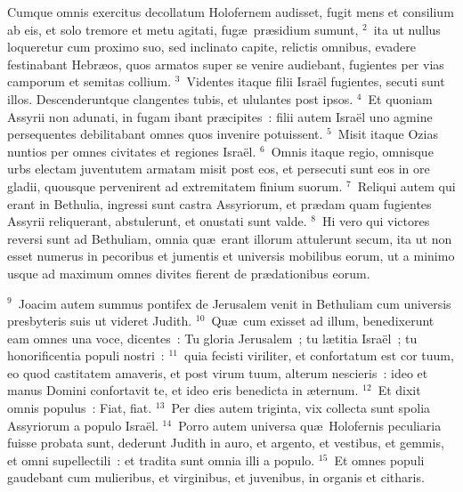 \lettrine[lines=3,image=true,loversize=0.05,lraise=-0.03]{C}{}umque omnis exercitus decollatum Holofernem audisset, fugit mens et consilium ab eis, et solo tremore et metu agitati, fug\ae\ pr\ae sidium sumunt,
${}^{2}$~ita ut nullus loqueretur cum proximo suo, sed inclinato capite, relictis omnibus, evadere festinabant Hebr\ae os, quos armatos super se venire audiebant, fugientes per vias camporum et semitas collium.
${}^{3}$~Videntes itaque filii Isra\"el fugientes, secuti sunt illos. Descenderuntque clangentes tubis, et ululantes post ipsos.
${}^{4}$~Et quoniam Assyrii non adunati, in fugam ibant pr\ae cipites~: filii autem Isra\"el uno agmine persequentes debilitabant omnes quos invenire potuissent.
${}^{5}$~Misit itaque Ozias nuntios per omnes civitates et regiones Isra\"el.
${}^{6}$~Omnis itaque regio, omnisque urbs electam juventutem armatam misit post eos, et persecuti sunt eos in ore gladii, quousque pervenirent ad extremitatem finium suorum.
${}^{7}$~Reliqui autem qui erant in Bethulia, ingressi sunt castra Assyriorum, et pr\ae dam quam fugientes Assyrii reliquerant, abstulerunt, et onustati sunt valde.
${}^{8}$~Hi vero qui victores reversi sunt ad Bethuliam, omnia qu\ae\ erant illorum attulerunt secum, ita ut non esset numerus in pecoribus et jumentis et universis mobilibus eorum, ut a minimo usque ad maximum omnes divites fierent de pr\ae dationibus eorum.


${}^{9}$~Joacim autem summus pontifex de Jerusalem venit in Bethuliam cum universis presbyteris suis ut videret Judith.
${}^{10}$~Qu\ae\ cum exisset ad illum, benedixerunt eam omnes una voce, dicentes~: Tu gloria Jerusalem~; tu l\ae titia Isra\"el~; tu honorificentia populi nostri~:
${}^{11}$~quia fecisti viriliter, et confortatum est cor tuum, eo quod castitatem amaveris, et post virum tuum, alterum nescieris~: ideo et manus Domini confortavit te, et ideo eris benedicta in \ae ternum.
${}^{12}$~Et dixit omnis populus~: Fiat, fiat.
${}^{13}$~Per dies autem triginta, vix collecta sunt spolia Assyriorum a populo Isra\"el.
${}^{14}$~Porro autem universa qu\ae\ Holofernis peculiaria fuisse probata sunt, dederunt Judith in auro, et argento, et vestibus, et gemmis, et omni supellectili~: et tradita sunt omnia illi a populo.
${}^{15}$~Et omnes populi gaudebant cum mulieribus, et virginibus, et juvenibus, in organis et citharis.

